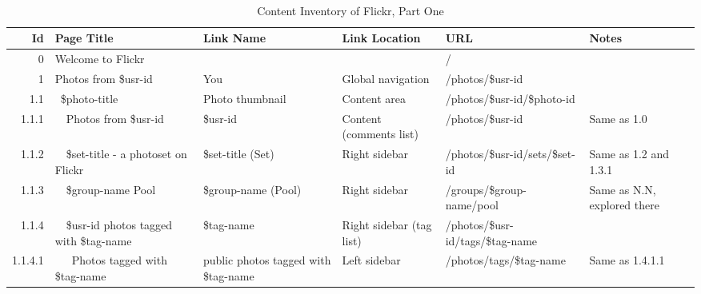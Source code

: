 \documentclass[12pt,a4paper]{article}
\begin{document}
\begin{landscape}
  \begin{table}[h!b!p!]
    \caption{Content Inventory of Flickr, Part One}
    \label{table:content.inventory.flickr.1}
    \begin{center}
      \begin{tiny}
        \tt
        \begin{tabular}{r|l|l|l|l|p{3cm}}
            Id &
            Page Title &
            Link Name &
            Link Location &
            URL &
            Notes \\

            \hline

            0 &
            Welcome to Flickr &
            &
            &
            / &
            \\

            1 &
            Photos from \$usr-id &
            You &
            Global navigation &
            /photos/\$usr-id &
            \\

              1.1 &
              ~\$photo-title &
              Photo thumbnail &
              Content area &
              /photos/\$usr-id/\$photo-id &
              \\

                1.1.1 &
                ~~Photos from \$usr-id &
                \$usr-id &
                Content (comments list) &
                /photos/\$usr-id &
                Same as 1.0\\

                1.1.2 &
                ~~\$set-title - a photoset on Flickr &
                \$set-title (Set) &
                Right sidebar &
                /photos/\$usr-id/sets/\$set-id &
                Same as 1.2 and 1.3.1 \\

                1.1.3 &
                ~~\$group-name Pool &
                \$group-name (Pool) &
                Right sidebar &
                /groups/\$group-name/pool &
                Same as N.N, explored there \\

                1.1.4 &
                ~~\$usr-id photos tagged with \$tag-name &
                \$tag-name &
                Right sidebar (tag list) &
                /photos/\$usr-id/tags/\$tag-name &
                \\

                  1.1.4.1 &
                  ~~~Photos tagged with \$tag-name &
                  public photos tagged with \$tag-name &
                  Left sidebar &
                  /photos/tags/\$tag-name &
                  Same as 1.4.1.1 \\


\end{tabular}
\end{tiny}
\end{center}
\end{table}
\end{landscape}
\end{document}

